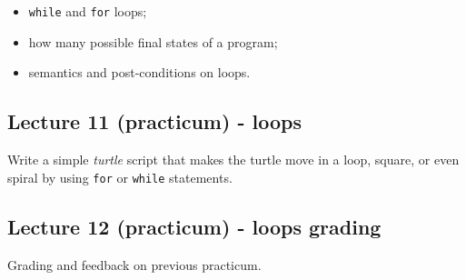 \documentclass[12pt,a4paper,final]{article}
\begin{document}
\begin{itemize}
\item \texttt{while} and \texttt{for} loops;
\item how many possible final states of a program;
\item semantics and post-conditions on loops.
\end{itemize}


\subsection{Lecture 11 (practicum) - loops}
Write a simple \textit{turtle} script that makes the turtle move in a loop, square, or even spiral by using \texttt{for} or \texttt{while} statements.


\subsection{Lecture 12 (practicum) - loops grading}
Grading and feedback on previous practicum.


\end{document}
